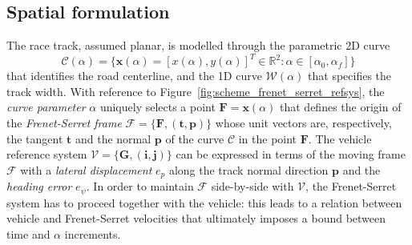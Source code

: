 \documentclass[conference]{IEEEtran} %
\renewcommand{\vec}[1]{\boldsymbol{#1}}
\DeclarePairedDelimiter{\norm}{\lVert}{\rVert}
\begin{document}
\subsection{Spatial formulation}

The race track, assumed planar, is modelled through the parametric 2D curve 
\begin{equation}
\mathcal C(\alpha) = \{ \vec x (\alpha) = [x(\alpha), y(\alpha)]^T \in \mathbb{R}^2 : \alpha \in [\alpha_0, \alpha_f] \}
\end{equation}
%
that identifies the road centerline, and the 1D curve $\mathcal W(\alpha)$ that specifies the track width.
With reference to Figure~\ref{fig:scheme_frenet_serret_refsys}, the \emph{curve parameter} $\alpha$ uniquely selects a point $\vec F = \vec x(\alpha)$ that defines the origin of the \emph{Frenet-Serret frame} $\mathcal F = \{ \vec F, (\vec t, \vec p) \}$ whose unit vectors are, respectively, the tangent $\vec t$ and the normal $\vec p$ of the curve $\mathcal C$ in the point $\vec F$.
%
The vehicle reference system $\mathcal V = \{ \vec G, (\vec i, \vec j) \}$ can be expressed in terms of the moving frame $\mathcal F$ with a \emph{lateral displacement} $e_p$ along the track normal direction $\vec p$ and the \emph{heading error} $e_\psi$.
In order to maintain $\mathcal F$ side-by-side with $\mathcal V$, the Frenet-Serret system has to proceed together with the vehicle: this leads to a relation between vehicle and Frenet-Serret velocities that ultimately imposes a bound between time and $\alpha$ increments.

%
\end{document}
